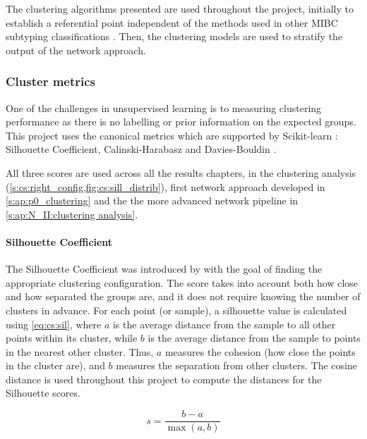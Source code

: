 The clustering algorithms presented are used throughout the project, initially to establish a referential point independent of the methods used in other MIBC subtyping classifications \citep{Robertson2017-mg, Marzouka2018-ge, Kamoun2020-tj}. Then, the clustering models are used to stratify the output of the network approach.


\subsubsection*{Cluster metrics} \label{s:lit:clustering_metrics}

One of the challenges in unsupervised learning is to measuring clustering performance as there is no labelling or prior information on the expected groups. This project uses the canonical metrics which are supported by Scikit-learn \citep{Pedregosa2011-ts,Scikit-learn_undated-ax}: Silhouette Coefficient, Calinski-Harabasz and Davies-Bouldin \citep{Rousseeuw1987-wy,Calinski1974-uu,Davies1979-tn}. 

All three scores are used across all the results chapters, in the clustering analysis (\cref{s:cs:right_config,fig:cs:sill_distrib}), first network approach developed in \cref{s:ap:p0_clustering} and the the more advanced network pipeline in \cref{s:ap:N_II:clustering analysis}.


\paragraph*{Silhouette Coefficient} \label{s:lit:silhouette}

The Silhouette Coefficient was introduced by \citet{Rousseeuw1987-wy} with the goal of finding the appropriate clustering configuration. The score takes into account both how close and how separated the groups are, and it does not require knowing the number of clusters in advance. For each point (or sample), a silhouette value is calculated using \cref{eq:cs:sil}, where \(a\) is the average distance from the sample to all other points within its cluster, while \(b\) is the average distance from the sample to points in the nearest other cluster. Thus, \(a\) measures the cohesion (how close the points in the cluster are), and \(b\) measures the separation from other clusters. The cosine distance is used throughout this project to compute the distances for the Silhouette scores.

\begin{equation} \label{eq:cs:sil}
    s = \frac{b - a}{\max(a, b)}
\end{equation}

